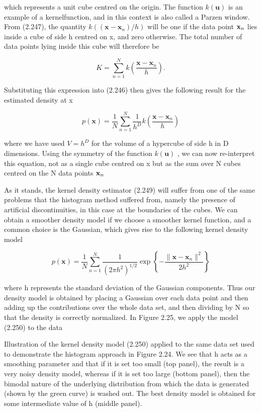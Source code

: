 \documentclass[
  10
]{article}
\begin{document}
which represents a unit cube centred on the origin. The function
\(k ( { \mathbf { u } } )\) is an example of a kernelfunction, and in
this context is also called a Parzen window. From (2.247), the quantity
\(k ( ( \mathbf { x } - \mathbf { x } _ { n } ) / h )\) will be one if
the data point \({ \bf x } _ { n }\) lies inside a cube of side h
centred on x, and zero otherwise. The total number of data points lying
inside this cube will therefore be

\[
K = \sum_ {n = 1} ^ {N} k \left(\frac {\mathbf {x} - \mathbf {x} _ {n}}{h}\right).\tag{2.248}
\]

Substituting this expression into (2.246) then gives the following
result for the estimated density at x

\[
p (\mathbf {x}) = \frac {1}{N} \sum_ {n = 1} ^ {N} \frac {1}{h ^ {D}} k \left(\frac {\mathbf {x} - \mathbf {x} _ {n}}{h}\right)\tag{2.249}
\]

where we have used \(V = h ^ { D }\) for the volume of a hypercube of
side h in D dimensions. Using the symmetry of the function
\(k ( \mathbf { u } )\) , we can now re-interpret this equation, not as
a single cube centred on x but as the sum over N cubes centred on the N
data points \({ \bf x } _ { n }\)

As it stands, the kernel density estimator (2.249) will suffer from one
of the same problems that the histogram method suffered from, namely the
presence of artificial discontinuities, in this case at the boundaries
of the cubes. We can obtain a smoother density model if we choose a
smoother kernel function, and a common choice is the Gaussian, which
gives rise to the following kernel density model

\[
p (\mathbf {x}) = \frac {1}{N} \sum_ {n = 1} ^ {N} \frac {1}{(2 \pi h ^ {2}) ^ {1 / 2}} \exp \left\{- \frac {\| \mathbf {x} - \mathbf {x} _ {n} \| ^ {2}}{2 h ^ {2}} \right\}\tag{2.250}
\]

where h represents the standard deviation of the Gaussian components.
Thus our density model is obtained by placing a Gaussian over each data
point and then adding up the contributions over the whole data set, and
then dividing by N so that the density is correctly normalized. In
Figure 2.25, we apply the model (2.250) to the data

Illustration of the kernel density model (2.250) applied to the same
data set used to demonstrate the histogram approach in Figure 2.24. We
see that h acts as a smoothing parameter and that if it is set too small
(top panel), the result is a very noisy density model, whereas if it is
set too large (bottom panel), then the bimodal nature of the underlying
distribution from which the data is generated (shown by the green curve)
is washed out. The best density model is obtained for some intermediate
value of h (middle panel).
\end{document}
